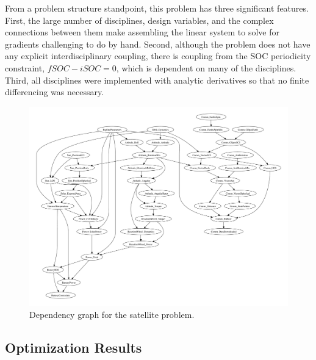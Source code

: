 \documentclass[]{aiaa-tc} %
\begin{document}
    From a problem structure standpoint, this problem has three significant features. First, the large number of
    disciplines, design variables, and the complex connections between them make assembling the linear system to solve for gradients
    challenging to do by hand. Second, although the problem does not have any explicit interdisciplinary coupling,
    there is coupling from the SOC periodicity constraint, $fSOC - iSOC = 0$, which is dependent on many of the
    disciplines. Third, all disciplines were implemented with analytic derivatives so that no finite differencing was
    necessary.

    \begin{figure}[!htb]\begin{center}
      \includegraphics[width=.95\textwidth]{images/CADRE.pdf}
      \caption{ Dependency graph for the satellite problem. \label{fig:cadre_graph}}
    \end{center}\end{figure}

    \subsection{Optimization Results}
\end{document}
